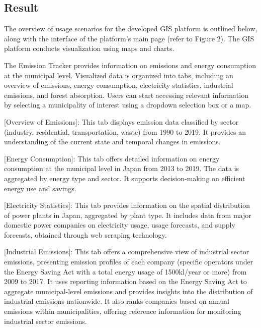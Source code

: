 \subsection{Result}
The overview of usage scenarios for the developed GIS platform is outlined below, along with the interface of the platform's main page (refer to Figure 2). The GIS platform conducts visualization using maps and charts.\par

The Emission Tracker provides information on emissions and energy consumption at the municipal level. Visualized data is organized into tabs, including an overview of emissions, energy consumption, electricity statistics, industrial emissions, and forest absorption. Users can start accessing relevant information by selecting a municipality of interest using a dropdown selection box or a map.\par

[Overview of Emissions]: This tab displays emission data classified by sector (industry, residential, transportation, waste) from 1990 to 2019. It provides an understanding of the current state and temporal changes in emissions.\par

[Energy Consumption]: This tab offers detailed information on energy consumption at the municipal level in Japan from 2013 to 2019. The data is aggregated by energy type and sector. It supports decision-making on efficient energy use and savings.\par

[Electricity Statistics]: This tab provides information on the spatial distribution of power plants in Japan, aggregated by plant type. It includes data from major domestic power companies on electricity usage, usage forecasts, and supply forecasts, obtained through web scraping technology.\par

[Industrial Emissions]: This tab offers a comprehensive view of industrial sector emissions, presenting emission profiles of each company (specific operators under the Energy Saving Act with a total energy usage of 1500kl/year or more) from 2009 to 2017. It uses reporting information based on the Energy Saving Act to aggregate municipal-level emissions and provides insights into the distribution of industrial emissions nationwide. It also ranks companies based on annual emissions within municipalities, offering reference information for monitoring industrial sector emissions.\par

